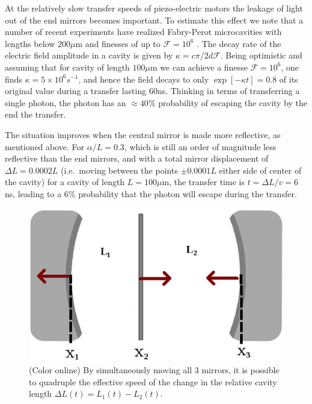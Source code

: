 \documentclass[twocolumn,english,pra,aps,superscriptaddress,floatfix]{revtex4-1}
\begin{document}
At the relatively slow transfer speeds of piezo-electric motors the leakage of light out of the end mirrors becomes important. To estimate this effect we note that a number of recent experiments have realized Fabry-Perot microcavities with lengths below $200 \mu$m and finesses of up to $\mathcal{F}=10^6$ \cite{brennecke07,colombe07,trupke07,murch08}. The decay rate of the electric field amplitude in a cavity is given by $\kappa= c \pi / 2 d \mathcal{F}$. Being optimistic and assuming that for cavity of length $100 \mu$m we can achieve a finesse $\mathcal{F}=10^6$, one finds $\kappa = 5 \times 10^6$$s^{-1}$, and hence the field decays to only $\exp[-\kappa t]=0.8$ of its original value during a transfer lasting $60$ns. Thinking in terms of transferring a single photon, the photon has an $\approx 40\%$ probability of escaping the cavity by the end the transfer. 

The situation improves when the central mirror is made more reflective, as mentioned above. For $\alpha/L=0.3$, which is still an order of magnitude less reflective than the end mirrors, and with a total mirror displacement of  $\Delta L=0.0002 L$ (i.e.\ moving between the points $\pm 0.0001 L$ either side of center of the cavity) for a cavity of length $L=100 \mu$m, the transfer time is $t= \Delta L /v= 6$ns, leading to a $6 \%$ probability that the photon will escape during the transfer.



 

\begin{figure}
\includegraphics[width=0.9\columnwidth]{CavityTripleMove}
\caption{(Color online) By simultaneously moving all 3 mirrors, it is possible to quadruple the effective speed of the change in the relative cavity length $\Delta L(t)=L_{1}(t)-L_{2}(t)$.}
\label{fig:CavityTripleMove}
\end{figure}
\end{document}
